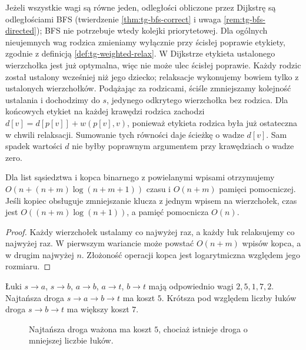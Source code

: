 \begin{uwaga}
\label{rem:tg-dijkstra-parents}
Jeżeli wszystkie wagi są równe jeden, odległości
obliczone przez Dijkstrę są odległościami BFS
(twierdzenie \ref{thm:tg-bfs-correct} i uwaga
\ref{rem:tg-bfs-directed}); BFS nie potrzebuje
wtedy kolejki priorytetowej.
Dla ogólnych nieujemnych wag rodzica zmieniamy
wyłącznie przy ścisłej poprawie etykiety, zgodnie
z definicją \ref{def:tg-weighted-relax}.
W Dijkstrze etykieta ustalonego wierzchołka jest
już optymalna, więc nie może ulec ścisłej poprawie.
Każdy rodzic został ustalony wcześniej niż jego
dziecko; relaksacje wykonujemy bowiem tylko z
ustalonych wierzchołków. Podążając za rodzicami,
ściśle zmniejszamy kolejność ustalania i dochodzimy
do $s$, jedynego odkrytego wierzchołka bez rodzica.
Dla końcowych etykiet na każdej krawędzi rodzica
zachodzi $d[v]=d[p[v]]+w(p[v],v)$, ponieważ etykieta
rodzica była już ostateczna w chwili relaksacji.
Sumowanie tych równości daje ścieżkę o wadze $d[v]$.
Sam spadek wartości $d$ nie byłby poprawnym
argumentem przy krawędziach o wadze zero.
\end{uwaga}

\begin{stwierdzenie}
\label{prop:tg-weighted-dijkstra-cost}
Dla list sąsiedztwa i kopca binarnego
z powielanymi wpisami otrzymujemy
$O(n+(n+m)\log(n+m+1))$ czasu
i $O(n+m)$ pamięci pomocniczej.
Jeśli kopiec obsługuje zmniejszanie klucza
z jednym wpisem na wierzchołek,
czas jest $O((n+m)\log(n+1))$,
a pamięć pomocnicza $O(n)$.
\end{stwierdzenie}
\begin{proof}
Każdy wierzchołek ustalamy co najwyżej raz,
a każdy łuk relaksujemy co najwyżej raz.
W pierwszym wariancie może powstać $O(n+m)$
wpisów kopca, a w drugim najwyżej $n$.
Złożoność operacji kopca jest
logarytmiczna względem jego rozmiaru.
\end{proof}

\begin{przyklad}
\label{ex:tg-weighted-sample}
Łuki $s\to a$, $s\to b$, $a\to b$,
$a\to t$, $b\to t$ mają odpowiednio
wagi $2,5,1,7,2$.
Najtańsza droga $s\to a\to b\to t$
ma koszt $5$. Krótsza pod względem
liczby łuków droga $s\to b\to t$
ma większy koszt $7$.
\end{przyklad}

\begin{figure}[htbp]
\centering
{}
\caption{Najtańsza droga ważona ma koszt $5$,
chociaż istnieje droga o mniejszej liczbie łuków.}
\label{fig:tg-weighted-sample}
\end{figure}

